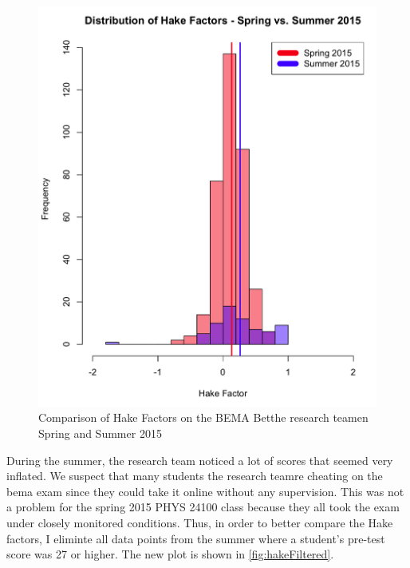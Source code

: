 \begin{figure}[!htb]
	\centering
	\includegraphics[width=6in]{img/chapter4/hake_spring_vs_summer_full}
	\caption[Comparison of Hake Factors on the BEMA Betthe research teamen Spring and Summer 2015]{Comparison of Hake Factors on the BEMA Betthe research teamen Spring and Summer 2015}
  \label{fig:hakeFull}
\end{figure}

During the summer, the research team noticed a lot of scores that seemed very inflated. We suspect that many students the research teamre cheating on the \gls{bema} exam since they could take it online without any supervision. This was not a problem for the spring 2015 PHYS 24100 class because they all took the exam under closely monitored conditions. Thus, in order to better compare the Hake factors, I eliminte all data points from the summer where a student's pre-test score was 27 or higher. The new plot is shown in \ref{fig:hakeFiltered}.

